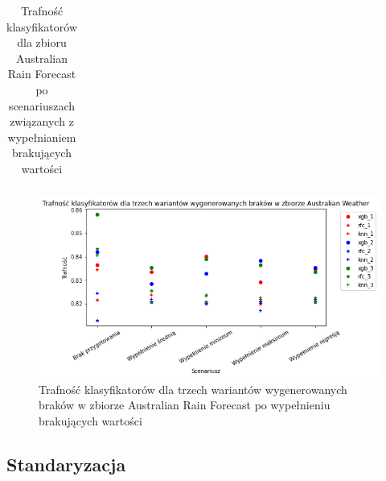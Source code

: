 \documentclass{book}
\begin{document}
\begin{table}[H]
\begin{tabular}{|l|l|r|r|r|r|r|}
    \end{tabular}
    \caption{Trafność klasyfikatorów dla zbioru Australian Rain Forecast po scenariuszach związanych z wypełnianiem brakujących wartości}
    \end{table}

    \begin{figure}[H]
        \centerline{\includegraphics[scale=0.8]{Aus_Weather_Wypełnienie_brakujących}}
        \centering
        \caption{Trafność klasyfikatorów dla trzech wariantów wygenerowanych braków w zbiorze Australian Rain Forecast po wypełnieniu brakujących wartości}
        \end{figure}


\subsection{Standaryzacja}
\end{document}
